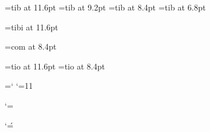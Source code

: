 \font\twelvebf=tib at 11.6pt
\font\ninebf=tib at 9.2pt
\font\eightbf=tib at 8.4pt	%
\font\sixbf=tib at 6.8pt	%

\font\twelvebi=tibi at 11.6pt

\font\eighttt=com at 8.4pt	%

\font\twelvesl=tio at 11.6pt
\font\eightsl=tio at 8.4pt	%



\chardef\atcode=\catcode`\@	%
\catcode`\@=11			%


\def\MTEXMOD#1#2#3{%
 \dimen@#1\relax\PSZ@
 \FONT@{mtex}\nextiii@\textfont\thr@@\next@
 \setbox\z@\hbox{\next@ B}\p@renwd\wd\z@
 \ifx\amstexloaded@\relax
  \buffer@\fontdimen13 \next@
  \buffer\buffer@
 \fi
 \FONT@{mtex}\nextiii@\scriptfont\thr@@\next@
 \FONT@{mtex}\nextiii@\scriptscriptfont\thr@@\next@\relax}

\catcode`\@=\atcode		%





\catcode`\'=\rqcode		%

